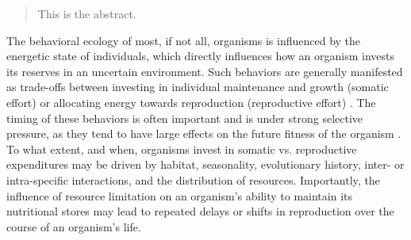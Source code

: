 \documentclass{pnastwo}
\begin{document}
\begin{article}


\begin{abstract}
This is the abstract.
\end{abstract}

The behavioral ecology of most, if not all, organisms is influenced by the energetic state of individuals, which directly influences how an organism invests its reserves in an uncertain environment.
Such behaviors are generally manifested as trade-offs between investing in individual maintenance and growth (somatic effort) or allocating energy towards reproduction (reproductive effort) \cite{Martin:1987dl,Kirk:1997cc,Kempes:2012hy}. %
The timing of these behaviors is often important and is under strong selective pressure, as they tend to have large effects on the future fitness of the organism \cite{Mangel:1988uaa}.
To what extent, and when, organisms invest in somatic vs. reproductive expenditures may be driven by habitat, seasonality, evolutionary history, inter- or intra-specific interactions, and the distribution of resources.
Importantly, the influence of resource limitation on an organism's ability to maintain its nutritional stores may lead to repeated delays or shifts in reproduction over the course of an organism's life. %


\end{article}
\end{document}
